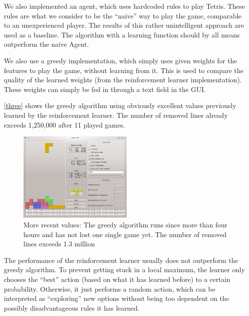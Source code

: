 \documentclass{ml}
\begin{document}
We also implemented an agent, which uses hardcoded rules to play Tetris. 
These rules are what we consider to be the ``naive'' way to play the game, comparable to an unexperienced player. 
The results of this rather unintelligent approach are used as a baseline. 
The algorithm with a learning function should by all means outperform the naive Agent.

We also use a greedy implementation, which simply uses given weights for the features to play the game, without learning from it. 
This is used to compare the quality of the learned weights (from the reinforcement learner implementation). 
These weights can simply be fed in through a text field in the GUI. 

\autoref{three} shows the greedy algorithm using obviously excellent values previously learned by the reinforcement learner.
The number of removed lines already exceeds 1,250,000 after 11 played games. 

\begin{figure}
\vspace{-10pt}
  \begin{center}
    \includegraphics[width=0.5\textwidth]{img/restit4.jpg}
  \end{center}
  \vspace{-20pt}
  \caption{\footnotesize{More recent values: The greedy algorithm runs since more than four hours and has not lost one single game yet. The number of removed lines exceeds 1.3 million}}
  \label{four}
  \vspace{-15pt}
\end{figure}

The performance of the reinforcement learner usually does not outperform the greedy algorithm. 
To prevent getting stuck in a local maximum, the learner only chooses the ``best'' action (based on what it has learned before) to a certain probability. 
Otherwise, it just performs a random action, which can be interpreted as ``exploring'' new options without being too dependent on the possibly disadvantageous rules it has learned. 
\end{document}
